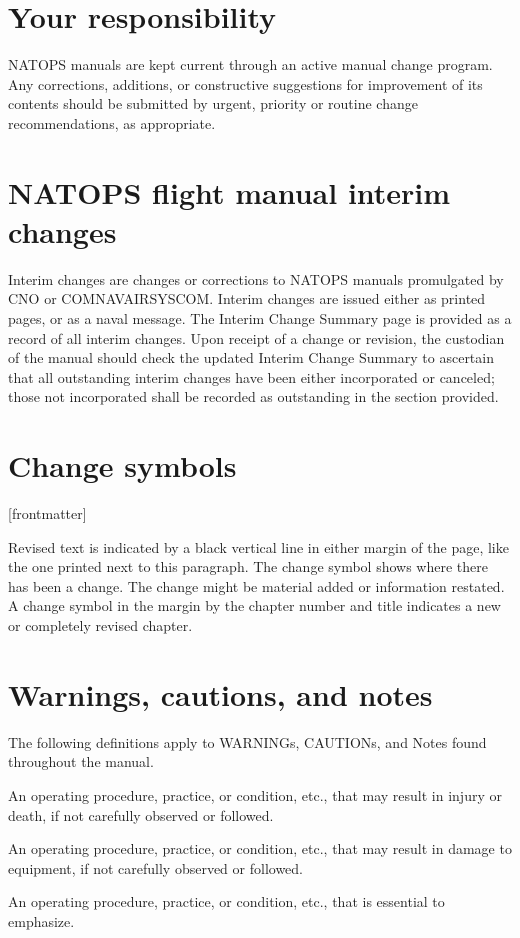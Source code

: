 \documentclass{book}
\begin{document}
\section*{Your responsibility}
NATOPS manuals are kept current through an active manual change program. Any corrections, additions, or constructive suggestions for improvement of its contents should be submitted by urgent, priority or routine change recommendations, as appropriate.

\section*{NATOPS flight manual interim changes}
Interim changes are changes or corrections to NATOPS manuals promulgated by CNO or COMNAVAIRSYSCOM. Interim changes are issued either as printed pages, or as a naval message. The Interim Change Summary page is provided as a record of all interim changes. Upon receipt of a change or revision, the custodian of the manual should check the updated Interim Change Summary to ascertain that all outstanding interim changes have been either incorporated or canceled; those not incorporated shall be recorded as outstanding in the section provided.

\section*{Change symbols}
[frontmatter]{%
}
\thispagestyle{rev1}
\begin{changebar}
Revised text is indicated by a black vertical line in either margin of the page, like the one printed next to this paragraph. The change symbol shows where there has been a change. The change might be material added or information restated. A change symbol in the margin by the chapter number and title indicates a new or completely revised chapter.
\end{changebar}
  
\clearpage
\section*{Warnings, cautions, and notes}
The following definitions apply to WARNINGs, CAUTIONs, and Notes found throughout the manual.
\begin{warning}
An operating procedure, practice, or condition, etc., that may result in injury or death, if not carefully observed or followed.
\end{warning}
\begin{caution}
An operating procedure, practice, or condition, etc., that may result in damage to equipment, if not carefully observed or followed.
\end{caution}
\begin{note}
An operating procedure, practice, or condition, etc., that is essential to emphasize.
\end{note}
\end{document}

